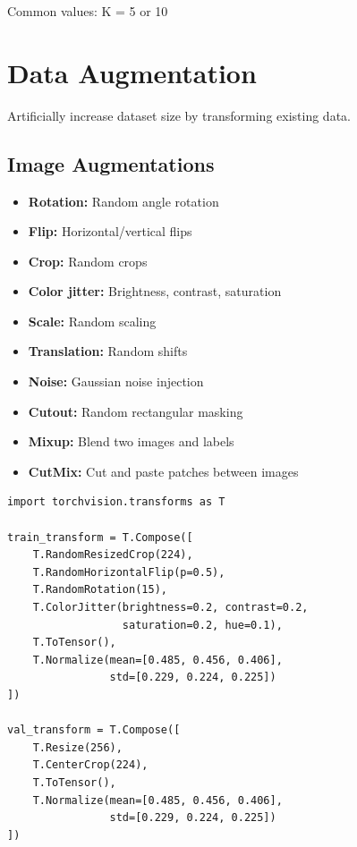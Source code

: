 Common values: K = 5 or 10

\section{Data Augmentation}

Artificially increase dataset size by transforming existing data.

\subsection{Image Augmentations}

\begin{itemize}
    \item \textbf{Rotation:} Random angle rotation
    \item \textbf{Flip:} Horizontal/vertical flips
    \item \textbf{Crop:} Random crops
    \item \textbf{Color jitter:} Brightness, contrast, saturation
    \item \textbf{Scale:} Random scaling
    \item \textbf{Translation:} Random shifts
    \item \textbf{Noise:} Gaussian noise injection
    \item \textbf{Cutout:} Random rectangular masking
    \item \textbf{Mixup:} Blend two images and labels
    \item \textbf{CutMix:} Cut and paste patches between images
\end{itemize}

\begin{code}
    \label{code:augmentation}
\begin{verbatim}
import torchvision.transforms as T

train_transform = T.Compose([
    T.RandomResizedCrop(224),
    T.RandomHorizontalFlip(p=0.5),
    T.RandomRotation(15),
    T.ColorJitter(brightness=0.2, contrast=0.2, 
                  saturation=0.2, hue=0.1),
    T.ToTensor(),
    T.Normalize(mean=[0.485, 0.456, 0.406],
                std=[0.229, 0.224, 0.225])
])

val_transform = T.Compose([
    T.Resize(256),
    T.CenterCrop(224),
    T.ToTensor(),
    T.Normalize(mean=[0.485, 0.456, 0.406],
                std=[0.229, 0.224, 0.225])
])
\end{verbatim}
\end{code}

